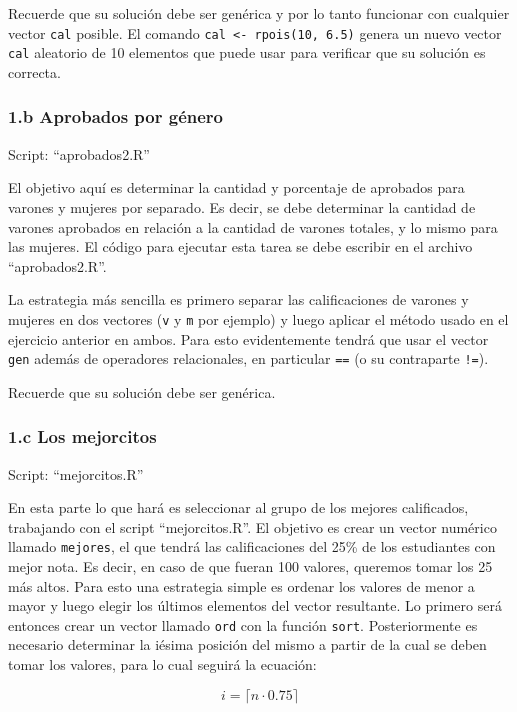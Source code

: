 \documentclass[]{article}
\begin{document}
Recuerde que su solución debe ser genérica y por lo tanto funcionar con
cualquier vector \texttt{cal} posible. El comando
\texttt{cal \textless{}- rpois(10, 6.5)} genera un nuevo vector
\texttt{cal} aleatorio de 10 elementos que puede usar para verificar que
su solución es correcta.

\subsubsection{1.b Aprobados por género}

Script: ``aprobados2.R''

El objetivo aquí es determinar la cantidad y porcentaje de aprobados
para varones y mujeres por separado. Es decir, se debe determinar la
cantidad de varones aprobados en relación a la cantidad de varones
totales, y lo mismo para las mujeres. El código para ejecutar esta tarea
se debe escribir en el archivo ``aprobados2.R''.

La estrategia más sencilla es primero separar las calificaciones de
varones y mujeres en dos vectores (\texttt{v} y \texttt{m} por ejemplo)
y luego aplicar el método usado en el ejercicio anterior en ambos. Para
esto evidentemente tendrá que usar el vector \texttt{gen} además de
operadores relacionales, en particular \texttt{==} (o su contraparte
\texttt{!=}).

Recuerde que su solución debe ser genérica.

\subsubsection{1.c Los mejorcitos}

Script: ``mejorcitos.R''

En esta parte lo que hará es seleccionar al grupo de los mejores
calificados, trabajando con el script ``mejorcitos.R''. El objetivo es
crear un vector numérico llamado \texttt{mejores}, el que tendrá las
calificaciones del 25\% de los estudiantes con mejor nota. Es decir, en
caso de que fueran 100 valores, queremos tomar los 25 más altos. Para
esto una estrategia simple es ordenar los valores de menor a mayor y
luego elegir los últimos elementos del vector resultante. Lo primero
será entonces crear un vector llamado \texttt{ord} con la función
\texttt{sort}. Posteriormente es necesario determinar la iésima posición
del mismo a partir de la cual se deben tomar los valores, para lo cual
seguirá la ecuación:

\[
  i = \lceil { n \cdot 0.75 } \rceil
\]
\end{document}
